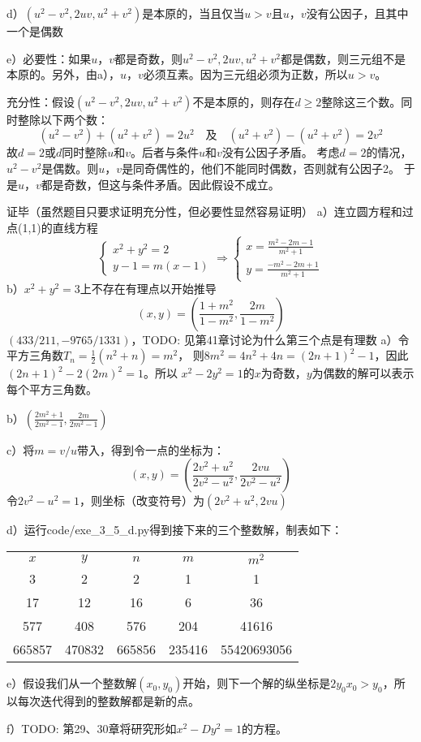 d）$(u^2-v^2,2uv, u^2+v^2)$是本原的，当且仅当$u>v$且$u$，$v$没有公因子，且其中一个是偶数\par
e）\proof 必要性：如果$u$，$v$都是奇数，则$u^2-v^2,2uv, u^2+v^2$都是偶数，则三元组不是本原的。另外，由a），$u$，$v$必须互素。因为三元组必须为正数，所以$u>v$。\par
充分性：假设$(u^2-v^2,2uv, u^2+v^2)$不是本原的，则存在$d\ge2$整除这三个数。同时整除以下两个数：
\[(u^2-v^2) + (u^2+v^2) = 2u^2\quad \text{及}\quad 
(u^2+v^2) - (u^2+v^2) = 2v^2\]
故$d=2$或$d$同时整除$u$和$v$。后者与条件$u$和$v$没有公因子矛盾。
考虑$d=2$的情况，$u^2-v^2$是偶数。则$u$，$v$是同奇偶性的，他们不能同时偶数，否则就有公因子2。
于是$u$，$v$都是奇数，但这与条件矛盾。因此假设不成立。\par
证毕（虽然题目只要求证明充分性，但必要性显然容易证明）
%
\exercise a）连立圆方程和过点(1,1)的直线方程
\[
\begin{cases}
    x^2+y^2=2 \\
    y-1=m(x-1)
\end{cases}\Rightarrow \begin{cases}
    x=\frac{m^2-2m-1}{m^2+1} \\
    y=\frac{-m^2-2m+1}{m^2+1}
\end{cases}
\]
b）$x^2+y^2=3$上不存在有理点以开始推导
%
\exercise
\[(x,y) = (\frac{1+m^2}{1-m^2}, \frac{2m}{1-m^2})\]
%
\exercise $(433/211, -9765/1331)$，TODO: 见第41章讨论为什么第三个点是有理数
%
\exercise a）令平方三角数$T_n=\frac{1}{2}(n^2+n)=m^2$，
则$8m^2=4n^2+4n=(2n+1)^2-1$，因此$(2n+1)^2-2(2m)^2=1$。所以
$x^2-2y^2=1$的$x$为奇数，$y$为偶数的解可以表示每个平方三角数。\par
b）$(\frac{2m^2+1}{2m^2-1},\frac{2m}{2m^2-1})$\par
c）将$m=v/u$带入，得到令一点的坐标为：
\[(x,y)=\left(\frac{2v^2+u^2}{2v^2-u^2}, \frac{2vu}{2v^2-u^2}\right)\]
令$2v^2-u^2=1$，则坐标（改变符号）为$(2v^2+u^2,2vu)$\par
d）运行code/exe\_3\_5\_d.py得到接下来的三个整数解，制表如下：
\begin{table}[!h]
\centering
\begin{tabular}{|c|c|c|c|c|}
    $x$ & $y$ & $n$ & $m$ & $m^2$ \\
    3 & 2 & 2 & 1 & 1 \\
    17 & 12 & 16 & 6 & 36 \\
    577 & 408 & 576 & 204 & 41616 \\
    665857 & 470832 & 665856 & 235416 & 55420693056 \\
\end{tabular}
\end{table}\par
e）假设我们从一个整数解$(x_0, y_0)$开始，则下一个解的纵坐标是$2y_0x_0 > y_0$，所以每次迭代得到的整数解都是新的点。\par
f）TODO: 第29、30章将研究形如$x^2-Dy^2=1$的方程。

